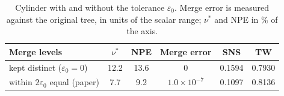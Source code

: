 \begin{table}[!htb]
\centering
\caption{Cylinder with and without the tolerance $\varepsilon_0$. Merge error is measured against the original tree, in units of the scalar range; $\nu^*$ and NPE in \% of the axis.}
\label{tab:cylinder-exact}
\footnotesize
\setlength{\tabcolsep}{3pt}
\begin{tabular}{@{}lccccc@{}}
\toprule
Merge levels & $\nu^*$ & NPE & Merge error & SNS & TW \\
\midrule
kept distinct ($\varepsilon_0=0$) & 12.2 & 13.6 & 0 & 0.1594 & 0.7930 \\
within $2\varepsilon_0$ equal (paper) & 7.7 & 9.2 & $1.0\times10^{-7}$ & 0.1097 & 0.8136 \\
\bottomrule
\end{tabular}
\end{table}
